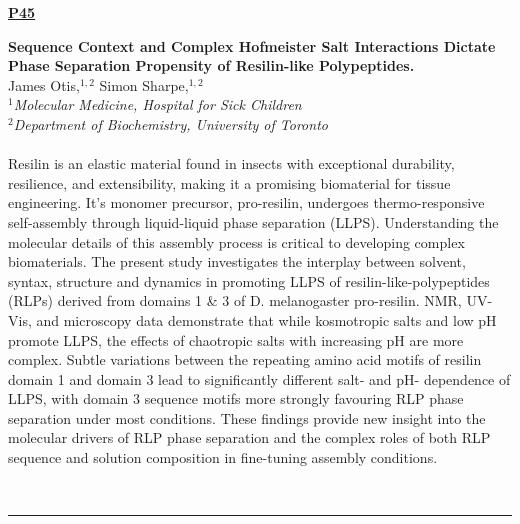 \documentclass[titlepage,oneside,openany,10pt]{book}
\newenvironment{posterabs}[4] %
        {
	\begin{flushright}
                \underline{\textbf{#4}}
        \end{flushright}
        \textbf{#1}\\%
        #2\\%
        \textit{#3}\\\\%
        }
        {
        \\
        \noindent\rule{15cm}{0.5pt}%
        }
\begin{document}
\begin{posterabs}
	{Sequence Context and Complex Hofmeister Salt Interactions Dictate Phase Separation Propensity of Resilin-like Polypeptides.}
	{James Otis,$^{1,2}$ Simon Sharpe,$^{1,2}$}
	{
	$^1$Molecular Medicine, Hospital for Sick Children\\
	$^2$Department of Biochemistry, University of Toronto
	}
	{P45}
	Resilin is an elastic material found in insects with exceptional durability, resilience, and extensibility, making it a promising biomaterial for tissue engineering. It's monomer precursor, pro-resilin, undergoes thermo-responsive self-assembly through liquid-liquid phase separation (LLPS). Understanding the molecular details of this assembly process is critical to developing complex biomaterials. The present study investigates the interplay between solvent, syntax, structure and dynamics in promoting LLPS of resilin-like-polypeptides (RLPs) derived from domains 1 \& 3 of D. melanogaster pro-resilin. NMR, UV-Vis, and microscopy data demonstrate that while kosmotropic salts and low pH promote LLPS, the effects of chaotropic salts with increasing pH are more complex. Subtle variations between the repeating amino acid motifs of resilin domain 1 and domain 3 lead to significantly different salt- and pH- dependence of LLPS, with domain 3 sequence motifs more strongly favouring RLP phase separation under most conditions. These findings provide new insight into the molecular drivers of RLP phase separation and the complex roles of both RLP sequence and solution composition in fine-tuning assembly conditions.
	\label{OtisJ}
\end{posterabs}

\vspace{1cm}
\end{document}
